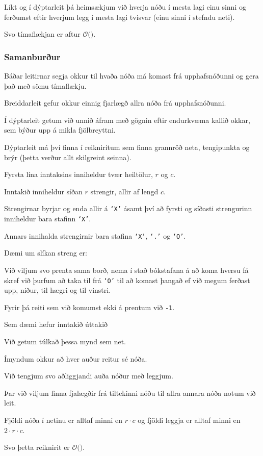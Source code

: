 {
	{
		\item<1-> Líkt og í dýptarleit þá heimsækjum við hverja nóðu í mesta lagi einu sinni og
					ferðumst eftir hverjum legg í mesta lagi tvisvar (einu sinni í stefndu neti).
		\item<2-> Svo tímaflækjan er aftur $\mathcal{O}($\onslide<3->{$E + V$}$)$.
	}
}

{
	\frametitle{Samanburður}
	{
		\item<1-> Báðar leitirnar segja okkur til hvaða nóða má komast frá upphafsnóðunni og gera það með sömu tímaflækju.
		\item<2-> Breiddarleit gefur okkur einnig fjarlægð allra nóða frá upphafsnóðunni.
		\item<3-> Í dýptarleit getum við unnið áfram með gögnin eftir endurkvæma kallið okkar, sem býður upp á mikla fjölbreyttni.
		\item<4-> Dýptarleit má því finna í reikniritum sem finna grannröð neta, tengipunkta og brýr (þetta verður allt skilgreint seinna).
	}
}

{
	{
		\item<1-> Fyrsta lína inntaksins inniheldur tvær heiltölur, $r$ og $c$.
		\item<2-> Inntakið inniheldur síðan $r$ strengir, allir af lengd $c$.
		\item<3-> Strengirnar byrjar og enda allir á \texttt{`X'} ásamt því að fyrsti og síðasti strengurinn inniheldur bara stafinn \texttt{`X'}.
		\item<4-> Annars innihalda strengirnir bara stafina \texttt{`X'}, \texttt{`.'} og \texttt{`O'}.
		\item<5-> Dæmi um slíkan streng er:
		\item<6-> Við viljum svo prenta sama borð, nema í stað bókstafana á að koma hversu fá skref við þurfum að taka til frá \texttt{`O'}
					til að komast þangað ef við megum ferðast upp, niður, til hægri og til vinstri.
		\item<7-> Fyrir þá reiti sem við komumst ekki á prentum við \texttt{-1}.
	}
}

{
	{
		\item<1-> Sem dæmi hefur inntakið
					úttakið	
	}
}

{
	{
		\item<1-> Við getum túlkað þessa mynd sem net.
		\item<2-> Ímyndum okkur að hver auður reitur sé nóða.
		\item<3-> Við tengjum svo aðliggjandi auða nóður með leggjum.
		\item<4-> Þar við viljum finna fjalægðir frá tiltekinni nóðu til allra annara nóða notum við leit.
		\item<6-> Fjöldi nóða í netinu er alltaf minni en $r \cdot c$ og fjöldi leggja er alltaf minni en $2 \cdot r \cdot c$.
		\item<7-> Svo þetta reiknirit er $\mathcal{O}($\onslide<8->{$r \cdot c$}$)$.
	}
}

